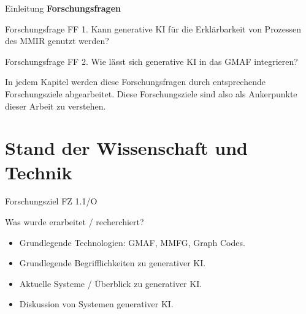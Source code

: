 \documentclass[t]{beamer}
\begin{document}
\begin{frame}{Einleitung}
  \textbf{Forschungsfragen}

  \begin{alertblock}{Forschungsfrage FF 1.}
    Kann generative KI für die Erklärbarkeit von Prozessen des MMIR genutzt werden?
    \\
  \end{alertblock}

  \begin{alertblock}{Forschungsfrage FF 2.}
    Wie lässt sich generative KI in das GMAF integrieren?
    \\
  \end{alertblock}
  In jedem Kapitel werden diese Forschungsfragen durch entsprechende Forschungsziele abgearbeitet.
  Diese Forschungsziele sind also als Ankerpunkte dieser Arbeit zu verstehen.
\end{frame}

\section{Stand der Wissenschaft und Technik}


\begin{frame}{Forschungsziel FZ 1.1/O}
  \begin{block}{Was wurde erarbeitet / recherchiert?}
    \begin{itemize}
      \item<+-> Grundlegende Technologien: GMAF, MMFG, Graph Codes.
      \item<+-> Grundlegende Begrifflichkeiten zu generativer KI.
      \item<+-> Aktuelle Systeme / Überblick zu generativer KI.
      \item<+-> Diskussion von Systemen generativer KI.
    \end{itemize}
  \end{block}
\end{frame}
\end{document}
